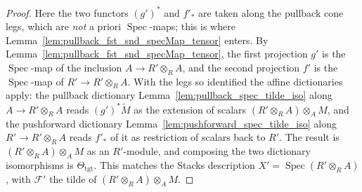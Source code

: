 \begin{proof}
  Here the two functors \((g')^*\) and \(f'_*\) are taken along the pullback cone legs,
  which are \emph{not} a priori \(\operatorname{Spec}\)-maps; this is where
  Lemma~\ref{lem:pullback_fst_snd_specMap_tensor} enters. By
  Lemma~\ref{lem:pullback_fst_snd_specMap_tensor}, the first projection \(g'\) is the
  \(\operatorname{Spec}\)-map of the inclusion \(A \to R' \otimes_R A\), and the second
  projection \(f'\) is the \(\operatorname{Spec}\)-map of \(R' \to R' \otimes_R A\).
  With the legs so identified the affine dictionaries apply:
  the pullback dictionary Lemma~\ref{lem:pullback_spec_tilde_iso} along
  \(A \to R' \otimes_R A\) reads \((g')^*\widetilde M\) as the extension of scalars
  \((R' \otimes_R A) \otimes_A M\), and the pushforward dictionary
  Lemma~\ref{lem:pushforward_spec_tilde_iso} along \(R' \to R' \otimes_R A\) reads
  \(f'_*\) of it as restriction of scalars back to \(R'\). The result is
  \((R' \otimes_R A) \otimes_A M\) as an \(R'\)-module, and composing the two dictionary
  isomorphisms is \(\Theta_{\mathrm{tgt}}\). This matches the Stacks description
  \(X' = \operatorname{Spec}(R' \otimes_R A)\), with \(\mathcal{F}'\) the tilde of
  \((R' \otimes_R A) \otimes_A M\).
\end{proof}

